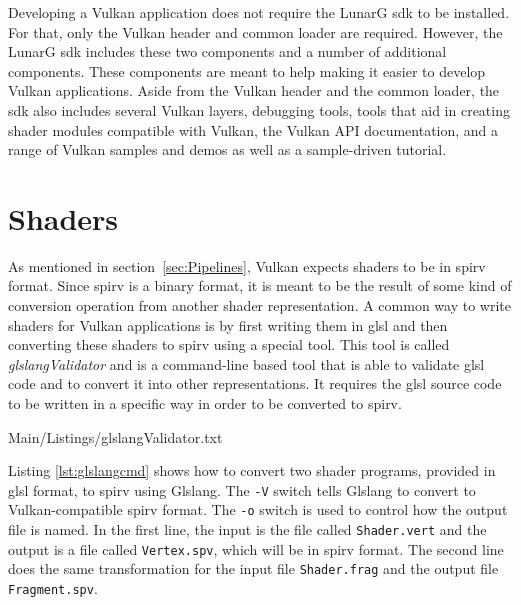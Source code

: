     Developing a Vulkan application does not require the LunarG \gls{sdk} to be installed.
    For that, only the Vulkan header and common loader are required.
    However, the LunarG \gls{sdk} includes these two components and a number of additional components.
    These components are meant to help making it easier to develop Vulkan applications.
    Aside from the Vulkan header and the common loader, the \gls{sdk} also includes several Vulkan layers, debugging tools, tools that aid in creating shader modules compatible with Vulkan, the Vulkan API documentation, and a range of Vulkan samples and demos as well as a sample-driven tutorial.



  \section{Shaders}
  \label{sec:EnvShaders}
    As mentioned in section~\ref{sec:Pipelines}, Vulkan expects shaders to be in \gls{spirv} format.
    Since \gls{spirv} is a binary format, it is meant to be the result of some kind of conversion operation from another shader representation.
     A common way to write shaders for Vulkan applications is by first writing them in \gls{glsl} and then converting these shaders to \gls{spirv} using a special tool.
    This tool is called \textit{glslangValidator}\cite{glslangrepo} and is a command-line based tool that is able to validate \gls{glsl} code and to convert it into other representations.
    It requires the \gls{glsl} source code to be written in a specific way in order to be converted to \gls{spirv}.

    
    {Main/Listings/glslangValidator.txt}


    Listing \ref{lst:glslangcmd} shows how to convert two shader programs, provided in \gls{glsl} format, to \gls{spirv} using Glslang.
    The \lstinline{-V} switch tells Glslang to convert to Vulkan-compatible \gls{spirv} format.
    The \lstinline{-o} switch is used to control how the output file is named.
    In the first line, the input is the file called \lstinline{Shader.vert} and the output is a file called \lstinline{Vertex.spv}, which will be in \gls{spirv} format.
    The second line does the same transformation for the input file \lstinline{Shader.frag} and the output file \lstinline{Fragment.spv}.

